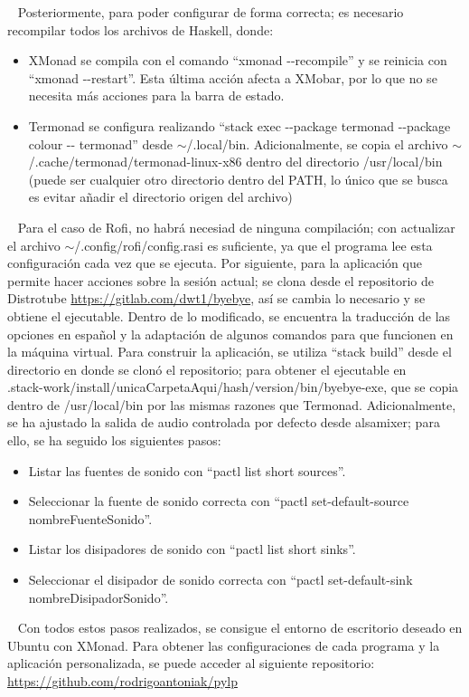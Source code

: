 \ \newline
\normalsize{ \indent
Posteriormente, para poder configurar de forma
correcta; es necesario recompilar todos los
archivos de Haskell, donde:
}
\begin{itemize}
	\item XMonad se compila con el comando
	``xmonad -{}-recompile'' y se reinicia con
	``xmonad -{}-restart''. Esta última acción
	afecta a XMobar, por lo que no se necesita
	más acciones para la barra de estado.
	\item Termonad se configura realizando
	``stack exec -{}-package termonad -{}-package
	colour -{}- termonad'' desde $\sim$/.local/bin.
	Adicionalmente, se copia el archivo
	$\sim$/.cache/termonad/termonad-linux-x86 dentro del directorio /usr/local/bin
	(puede ser cualquier otro directorio
	dentro del PATH, lo único que se busca
	es evitar añadir el directorio origen
	del archivo)
\end{itemize}
\ \newline
\normalsize{ \indent
Para el caso de Rofi, no habrá necesiad de
ninguna compilación; con actualizar el
archivo $\sim$/.config/rofi/config.rasi es
suficiente, ya que el programa lee esta
configuración cada vez que se ejecuta.
}
\newline
\normalsize{ \indent
Por siguiente, para la aplicación que permite
hacer acciones sobre la sesión actual; se
clona desde el repositorio de Distrotube
\url{https://gitlab.com/dwt1/byebye}, así
se cambia lo necesario y se obtiene el
ejecutable. Dentro de lo modificado, se
encuentra la traducción de las opciones
en español y la adaptación de algunos
comandos para que funcionen en la máquina
virtual.
}
\newline
\normalsize{ \indent
Para construir la aplicación, se utiliza
``stack build'' desde el directorio en donde
se clonó el repositorio; para obtener el
ejecutable en \\
.stack-work/install/unicaCarpetaAqui/hash/version/bin/byebye-exe,
que se copia dentro de /usr/local/bin por
las mismas razones que Termonad.
}
\newline
\normalsize{ \indent
Adicionalmente, se ha ajustado la salida
de audio controlada por defecto desde
alsamixer; para ello, se ha seguido los
siguientes pasos:
}
\begin{itemize}
	\item Listar las fuentes de sonido
	con ``pactl list short sources''.
	\item Seleccionar la fuente de sonido
	correcta con ``pactl set-default-source
	nombreFuenteSonido''.
	\item Listar los disipadores de sonido
	con ``pactl list short sinks''.
	\item Seleccionar el disipador de sonido
	correcta con ``pactl set-default-sink
	nombreDisipadorSonido''.
\end{itemize}
\ \newline
\normalsize{ \indent
Con todos estos pasos realizados, se
consigue el entorno de escritorio deseado
en Ubuntu con XMonad. Para obtener las
configuraciones de cada programa y la
aplicación personalizada, se puede acceder
al siguiente repositorio:
\url{https://github.com/rodrigoantoniak/pylp}
}